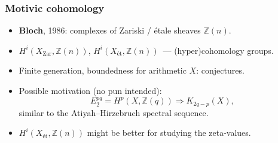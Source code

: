 \documentclass[handout]{beamer}
\newcommand{\personality}[1]{{\bf #1}}
\newcommand{\ZZ}{\mathbb{Z}}
\newcommand{\FF}{\mathbb{F}}
\newcommand{\isom}{\cong}
\begin{document}
\begin{frame}
  \frametitle{Motivic cohomology}

  \begin{itemize}
  \item<2-> \personality{Bloch}, 1986: complexes of Zariski / \'etale sheaves
    $\ZZ (n)$.


  \item<3-> $H^i (X_\text{Zar}, \ZZ (n))$, $H^i (X_\text{\'et}, \ZZ (n))$~---
    (hyper)cohomology groups.

  \item<4-> Finite generation, boundedness for arithmetic $X$: conjectures.

  \item<5-> Possible motivation (no pun intended):
    $$E_2^{pq} = H^p (X, \ZZ (q)) \Longrightarrow K_{2q-p} (X),$$
    similar to the Atiyah--Hirzebruch spectral sequence.

  \item<6-> $H^i (X_\text{\'et}, \ZZ (n))$ might be better for studying the
    zeta-values.
  \end{itemize}
\end{frame}

\end{document}
